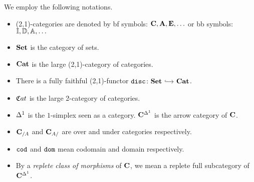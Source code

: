\documentclass[a4paper,dvipsnames, 11pt]{amsart}
\begin{document}
\maketitle
\begin{notation}
	We employ the following notations.
	\begin{itemize}
		\item %
			(2,1)-categories are denoted by bf symbols:
			$\mathbf{C},\mathbf{A},\mathbf{E},\ldots$
			or bb symbols:
			$\mathbb{I},\mathbb{D},\mathbb{A},\ldots$
		\item %
			$\mathbf{Set}$ is the category of sets.
		\item %
			${\mathbf{Cat}}$ is the large (2,1)-category of categories.
		\item %
			There is a fully faithful (2,1)-functor $\disc\colon\Set\arr[hook]\Cat$.
		\item %
			${{\mathfrak{C}}{at}}$ is the large 2-category of categories.
		\item %
			${\Delta^1}$ is the $1$-simplex seen as a category.
			$\mathbf{C}^{\Delta^1}$ is the arrow category of $\mathbf{C}$.
		\item %
			$\mathbf{C}_{/A}$ and $\mathbf{C}_{A/}$ are over and under categories respectively.
		\item %
			$\mathtt{cod}$ and $\mathtt{dom}$ mean codomain and domain respectively.
		\item %
			By a \emph{replete class of morphisms} of $\mathbf{C}$, we mean a replete full subcategory of $\mathbf{C}^{\Delta^1}$.
		\qedhere %
	\end{itemize}
\end{notation}
\end{document}
